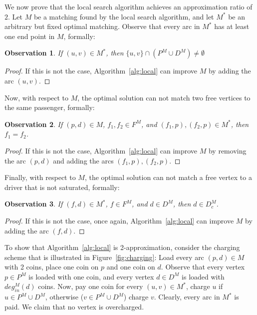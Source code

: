 \documentclass[]{llncs}
\newtheorem{observation}{Observation}
\newcommand{\din}[1][M]{deg^M_{in}}
\begin{document}
We now prove that the local search algorithm achieves an approximation ratio of $2$.
Let $M$ be a matching found by the local search algorithm, 
and let $M^*$ be an arbitrary but fixed optimal matching.
Observe that every arc in $M^*$ has at least one end point in $M$, formally: 
\begin{observation}
If $(u,v) \in M^*$, then $\{u,v\} \cap (P^M \cup D^M) \neq \emptyset$
\end{observation}

\begin{proof}
If this is not the case, Algorithm~\ref{alg:local} can improve $M$
by adding the arc $(u,v)$.  
\end{proof}

Now, with respect to $M$, the optimal solution can not match two free vertices to the same
passenger, formally:
\begin{observation}
\label{observation:one-free}
If $(p,d) \in M$, $f_1, f_2 \in F^M$, and $(f_1, p), (f_2, p) \in M^*$, then $f_1 = f_2$.
\end{observation}

\begin{proof}
If this is not the case, Algorithm~\ref{alg:local} can improve $M$ 
by removing the arc $(p,d)$ and adding the arcs $(f_1, p), (f_2, p)$.
\end{proof}

Finally, with respect to $M$, the optimal solution can not match a free vertex to a driver
that is not saturated, formally: 
\begin{observation}
\label{observation:saturated}
If $(f,d) \in M^*$, $f \in F^M$, and $d \in D^M$, then $d \in D^M_c$.
\end{observation}

\begin{proof}
If this is not the case, once again, Algorithm~\ref{alg:local} can improve $M$
by adding the arc $(f,d)$.
\end{proof}

To show that Algorithm~\ref{alg:local} is 2-approximation, 
consider the charging scheme that is illustrated in Figure~\ref{fig:charging}:
Load every arc $(p,d) \in M$ with 2 coins, 
place one coin on $p$ and one coin on $d$.
Observe that every vertex $p \in P^M$ is loaded with one coin, 
and every vertex $d \in D^M$ is loaded with $\din(d)$ coins.   
Now, pay one coin for every $(u,v) \in M^*$, charge $u$ if $u \in P^M \cup D^M$, 
otherwise ($v \in P^M \cup D^M$) charge $v$.
Clearly, every arc in $M^*$ is paid.
We claim that no vertex is overcharged.
\end{document}
